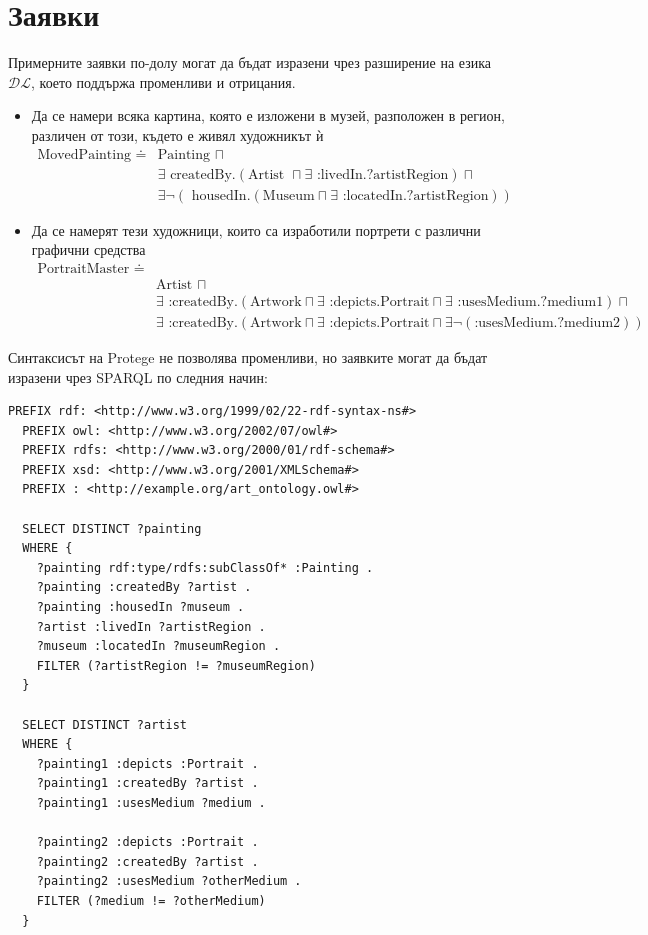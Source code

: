 \documentclass{article}
\begin{document}
\section*{Заявки}
Примерните заявки по-долу могат да бъдат изразени чрез разширение на езика $\mathcal{DL}$, което поддържа променливи и отрицания\cite{halReasoningDescription}.
\begin{itemize}
  \item Да се намери всяка картина, която е изложени в музей, разположен  в регион, различен от този, където е живял художникът ѝ
    \begin{align*}
      \text{MovedPainting } \doteq
      &\text{Painting } \sqcap\\
      &\exists \text{ createdBy}.(\text{Artist }\sqcap \exists \text{ :livedIn}.\text{?artistRegion}) \sqcap\\
      &\exists \neg(\text{ housedIn}.(\text{Museum} \sqcap \exists \text{ :locatedIn}.\text{?artistRegion}))
    \end{align*}
  \item Да се намерят тези художници, които са изработили портрети с различни графични средства
    \begin{align*}
      \text{PortraitMaster } \doteq\\
      &\text{Artist } \sqcap \\
      &\exists \text{ :createdBy}.(\text{Artwork} \sqcap \exists \text{ :depicts}.\text{Portrait} \sqcap \exists \text{ :usesMedium}.\text{?medium1}) \sqcap \\
      &\exists \text{ :createdBy}.(\text{Artwork} \sqcap \exists \text{ :depicts}.\text{Portrait} \sqcap \exists\neg (\text{:usesMedium}.\text{?medium2}))
    \end{align*}
\end{itemize}
Синтаксисът на Protege не позволява променливи, но заявките могат да бъдат изразени чрез SPARQL по следния начин:
\begin{lstlisting}[language=SPARQL]
  PREFIX rdf: <http://www.w3.org/1999/02/22-rdf-syntax-ns#>
  PREFIX owl: <http://www.w3.org/2002/07/owl#>
  PREFIX rdfs: <http://www.w3.org/2000/01/rdf-schema#>
  PREFIX xsd: <http://www.w3.org/2001/XMLSchema#>
  PREFIX : <http://example.org/art_ontology.owl#>

  SELECT DISTINCT ?painting
  WHERE {
    ?painting rdf:type/rdfs:subClassOf* :Painting .
    ?painting :createdBy ?artist .
    ?painting :housedIn ?museum .
    ?artist :livedIn ?artistRegion .
    ?museum :locatedIn ?museumRegion .
    FILTER (?artistRegion != ?museumRegion)
  }

  SELECT DISTINCT ?artist
  WHERE {
    ?painting1 :depicts :Portrait .
    ?painting1 :createdBy ?artist .
    ?painting1 :usesMedium ?medium .

    ?painting2 :depicts :Portrait .
    ?painting2 :createdBy ?artist .
    ?painting2 :usesMedium ?otherMedium .
    FILTER (?medium != ?otherMedium)
  }
\end{lstlisting}
\nocite{wikipediaCampbellsSoup,wikipediaGirlWith,wikipediaMonaLisa,wikipediaPortraitChalk,wikipediaThird1808,wikipediaHaystacksMonet,wikipediaStarryNight,wikipediaPeriodsWestern,wikipediaVisualArts,studiobinderHistoryTimeline}
\printbibliography
\end{document}
